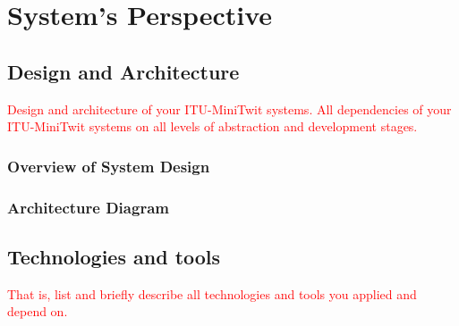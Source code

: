 \section{System's Perspective}
\subsection{Design and Architecture}
\textcolor{red}{Design and architecture of your ITU-MiniTwit systems. All dependencies of your ITU-MiniTwit systems on all levels of abstraction and development stages.}
\subsubsection*{Overview of System Design}
\subsubsection*{Architecture Diagram}
\subsection{Technologies and tools}
\textcolor{red}{That is, list and briefly describe all technologies and tools you applied and depend on.}
